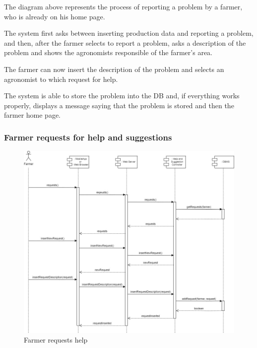 \documentclass{article}
\begin{document}
        The diagram above represents the process of reporting a problem by a farmer, who is already on his home page. \par
        The system first asks between inserting production data and reporting a problem, and then, after the farmer selects to report a problem, asks a description of the problem and shows the agronomists responsible of the farmer's area. \par
        The farmer can now insert the description of the problem and selects an agronomist to which request for help. \par
        The system is able to store the problem into the DB and, if everything works properly, displays a message saying that the problem is stored and then the farmer home page. \par
        
    
    \newpage
    
    
    \subsubsection{Farmer requests for help and suggestions}
        \begin{figure} [h]
            \centering
            \includegraphics[width=1\textwidth]{images/ArchitecturalDesign/RuntimeView/6. FarmerRequestHelp.jpg}
            \caption{\label{fig:farmerRequestHelp}Farmer requests help}
        \end{figure}
        
\end{document}
